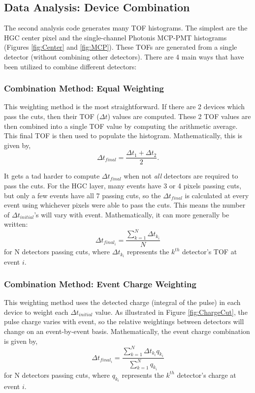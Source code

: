 \documentclass[twocolumn,aps,prd,reprint,superscriptaddress,floatfix]{revtex4-1}
\begin{document}
\subsection{Data Analysis: Device Combination}
The second analysis code generates many TOF histograms. 
The simplest are the HGC center pixel and the single-channel Photonis MCP-PMT histograms (Figures \ref{fig:Center} and \ref{fig:MCP}). 
These TOFs are generated from a single detector (without combining other detectors). 
There are 4 main ways that have been utilized to combine different detectors:

\subsubsection{Combination Method: Equal Weighting}
This weighting method is the most straightforward. 
If there are 2 devices which pass the cuts, then their TOF ($\Delta t$) values are computed. 
These 2 TOF values are then combined into a single TOF value by computing the arithmetic average. 
This final TOF is then used to populate the histogram. 
Mathematically, this is given by,
\[
\Delta t_{final} =
\dfrac{\Delta t_1 + \Delta t_2}{2} .
\]

It gets a tad harder to compute $\Delta t_{final}$ when not \textit{all} detectors are required to pass the cuts.
For the HGC layer, many events have 3 or 4 pixels passing cuts, but only a few events have all 7 passing cuts, so the $\Delta t_{final}$ is calculated at every event using whichever pixels were able to pass the cuts. 
This means the number of $\Delta t_{initial}$'s will vary with event. 
Mathematically, it can more generally be written:
\[
\Delta t_{final_i} =
\dfrac{\sum\limits_{k=1}^N \Delta t_{k_i}} {N} 
\]
for N detectors passing cuts, where $\Delta t_{k_i}$ represents the $k^{th}$ detector's TOF at event $i$.

\subsubsection{Combination Method: Event Charge Weighting}
This weighting method uses the detected charge (integral of the pulse) in each device to weight each $\Delta t_{initial}$ value. 
As illustrated in Figure \ref{fig:ChargeCut}, the pulse charge varies with event, so the relative weightings between detectors will change on an event-by-event basis. 
Mathematically, the event charge combination is given by,
\[
\Delta t_{final_i} =
\dfrac{\sum\limits_{k=1}^N \Delta t_{k_i} q_{k_i} }
	{\sum\limits_{k=1}^N q_{k_i} }
\]
for N detectors passing cuts, where $q_{k_i}$ represents the $k^{th}$ detector's charge at event $i$.
\end{document}
